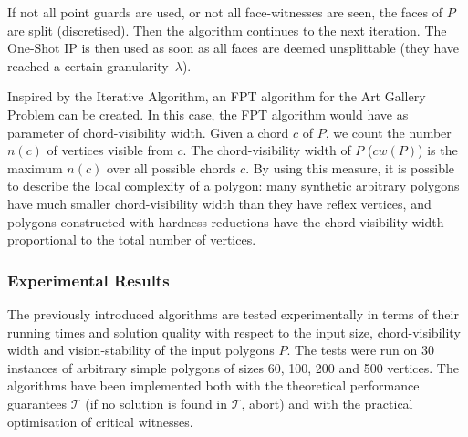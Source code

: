 If not all point guards are used, or not all face-witnesses are seen, the faces of $P$ are split (discretised). Then the algorithm continues to the next iteration. The One-Shot IP is then used as soon as all faces are deemed unsplittable (they have reached a certain granularity~$\lambda$). 



Inspired by the Iterative Algorithm, an FPT algorithm for the Art Gallery Problem can be created. In this case, the FPT algorithm would have as parameter of chord-visibility width. Given a chord $c$ of $P$, we count the number $n(c)$ of vertices visible from $c$. The chord-visibility width of $P$ ($cw(P)$)  is the maximum $n(c)$ over all possible chords $c$. By using this measure, it is possible to describe the local complexity of a polygon: many synthetic arbitrary polygons have much smaller chord-visibility width than they have reflex vertices, and polygons constructed with hardness reductions have the chord-visibility width proportional to the total number of vertices. 

\subsubsection{Experimental Results}
The previously introduced algorithms are tested experimentally in terms of their running times and solution quality with respect to the input size, chord-visibility width and vision-stability of the input polygons $P$. The tests were run on 30 instances of arbitrary simple polygons of sizes 60, 100, 200 and 500 vertices. The algorithms have been implemented both with the theoretical performance guarantees $\mathcal T$ (if no solution is found in $\mathcal T$, abort) and with the practical optimisation of critical witnesses.

